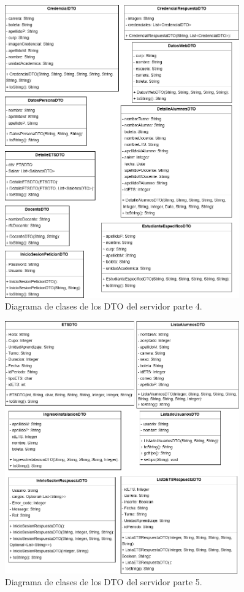 \begin{figure}[htbp!]
	\begin{center}
		\includegraphics[width=0.9\textwidth]{Clases/DTO4.png}
		\caption{Diagrama de clases de los DTO del servidor parte 4.}
		\label{fig:DTO4}
	\end{center}
\end{figure}

\begin{figure}[htbp!]
	\begin{center}
		\includegraphics[width=0.9\textwidth]{Clases/DTO5.png}
		\caption{Diagrama de clases de los DTO del servidor parte 5.}
		\label{fig:DTO5}
	\end{center}
\end{figure}

